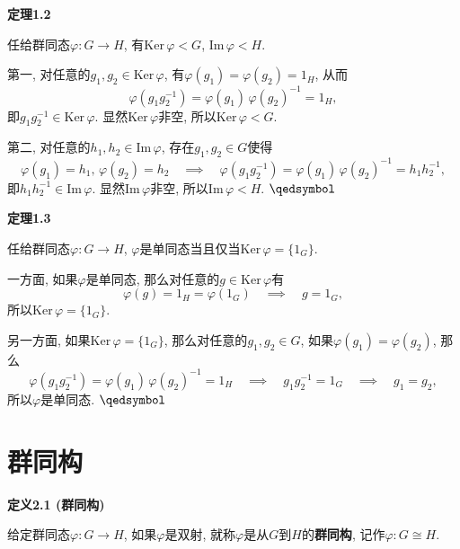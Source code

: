 \documentclass[UTF8]{ctexart}
\begin{document}
\vspace{10pt}

\hypertarget{sec:定理1.2}{}
\noindent\textbf{定理1.2}

任给群同态$\varphi:G\to H$, 有$\mathrm{Ker}\,\varphi<G$, $\mathrm{Im}\,\varphi<H$.


第一, 对任意的$g_1,g_2\in\mathrm{Ker}\,\varphi$,
有$\varphi(g_1)=\varphi(g_2)=1_H$, 从而
\[
    \varphi(g_1g_2^{-1})=\varphi(g_1)\,\varphi(g_2)^{-1}=1_H,
\]
即$g_1g_2^{-1}\in\mathrm{Ker}\,\varphi$.
显然$\mathrm{Ker}\,\varphi$非空, 所以$\mathrm{Ker}\,\varphi<G$.

第二, 对任意的$h_1,h_2\in\mathrm{Im}\,\varphi$, 存在$g_1,g_2\in G$使得
\[
    \varphi(g_1)=h_1,\,\varphi(g_2)=h_2\quad\implies\quad
    \varphi(g_1g_2^{-1})=\varphi(g_1)\,\varphi(g_2)^{-1}=h_1h_2^{-1},
\]
即$h_1h_2^{-1}\in\mathrm{Im}\,\varphi$.
显然$\mathrm{Im}\,\varphi$非空, 所以$\mathrm{Im}\,\varphi<H$.
\hfill $\qedsymbol$

\vspace{10pt}

\hypertarget{sec:定理1.3}{}
\noindent\textbf{定理1.3}

任给群同态$\varphi:G\to H$, $\varphi$是单同态当且仅当$\mathrm{Ker}\,\varphi=\{1_G\}$.


一方面, 如果$\varphi$是单同态, 那么对任意的$g\in\mathrm{Ker}\,\varphi$有
\[
    \varphi(g)=1_H=\varphi(1_G)\quad\implies\quad g=1_G,
\]
所以$\mathrm{Ker}\,\varphi=\{1_G\}$.

另一方面, 如果$\mathrm{Ker}\,\varphi=\{1_G\}$, 那么对任意的$g_1,g_2\in G$,
如果$\varphi(g_1)=\varphi(g_2)$, 那么
\[
    \varphi(g_1g_2^{-1})=\varphi(g_1)\,\varphi(g_2)^{-1}=1_H\quad\implies\quad
    g_1g_2^{-1}=1_G\quad\implies\quad g_1=g_2,
\]
所以$\varphi$是单同态. \hfill $\qedsymbol$





\newpage

\section{群同构}

\hypertarget{sec:定义2.1}{}
\noindent\textbf{定义2.1 (群同构)}

给定群同态$\varphi:G\to H$, 如果$\varphi$是双射,
就称$\varphi$是从$G$到$H$的\textbf{群同构}, 记作$\varphi:G\cong H$.

\vspace{10pt}
\end{document}
